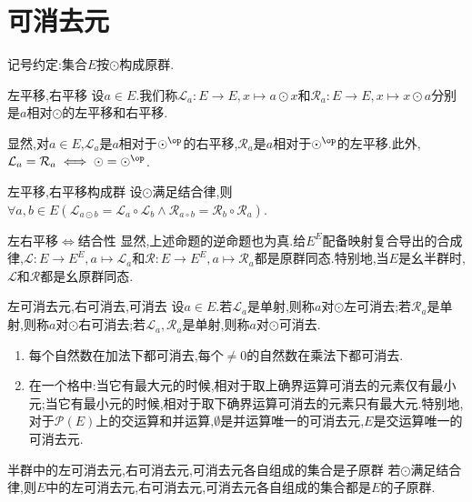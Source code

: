 \section{可消去元}

记号约定:集合$E$按$\odot$构成原群.

\begin{definition}{左平移,右平移}{}
	设$a\in E$.我们称$\mathcal{L}_{a}:E\to E,x\mapsto a\odot x$和$\mathcal{R}_{a}:E\to E,x\mapsto x\odot a$分别是$a$相对$\odot$的左平移和右平移.
\end{definition}

显然,对$a\in E$,$\mathcal{L}_{a}$是$a$相对于$\odot^{\op}$的右平移,$\mathcal{R}_{a}$是$a$相对于$\odot^{\op}$的左平移.此外,$\mathcal{L}_{a}=\mathcal{R}_{a}\iff\odot=\odot^{\op}$.

\begin{proposition}{左平移,右平移构成群}{}
	设$\odot$满足结合律,则$\forall a,b\in E\left(\mathcal{L}_{a\odot b}=\mathcal{L}_{a}\circ\mathcal{L}_{b}\wedge\mathcal{R}_{a\circ b}=\mathcal{R}_{b}\circ\mathcal{R}_{a}\right)$.
\end{proposition}

\begin{remark}{左右平移$\iff$结合性}{}
	显然,上述命题的逆命题也为真.给$E^{E}$配备映射复合导出的合成律,$\mathcal{L}:E\to E^{E},a\mapsto\mathcal{L}_{a}$和$\mathcal{R}:E\to E^{E},a\mapsto\mathcal{R}_{a}$都是原群同态.特别地,当$E$是幺半群时,$\mathcal{L}$和$\mathcal{R}$都是幺原群同态.
\end{remark}

\begin{definition}{左可消去元,右可消去,可消去}{}
	设$a\in E$.若$\mathcal{L}_{a}$是单射,则称$a$对$\odot$左可消去;若$\mathcal{R}_{a}$是单射,则称$a$对$\odot$右可消去;若$\mathcal{L}_{a},\mathcal{R}_{a}$是单射,则称$a$对$\odot$可消去.
\end{definition}

\begin{example}{}{}
	\begin{enumerate}
		\item 每个自然数在加法下都可消去,每个$\neq 0$的自然数在乘法下都可消去.
		\item 在一个格中:当它有最大元的时候,相对于取上确界运算可消去的元素仅有最小元;当它有最小元的时候,相对于取下确界运算可消去的元素只有最大元.特别地,对于$\mathcal{P}\left(E\right)$上的交运算和并运算,$\emptyset$是并运算唯一的可消去元,$E$是交运算唯一的可消去元.
	\end{enumerate}
\end{example}

\begin{proposition}{半群中的左可消去元,右可消去元,可消去元各自组成的集合是子原群}{}
	若$\odot$满足结合律,则$E$中的左可消去元,右可消去元,可消去元各自组成的集合都是$E$的子原群.
\end{proposition}







